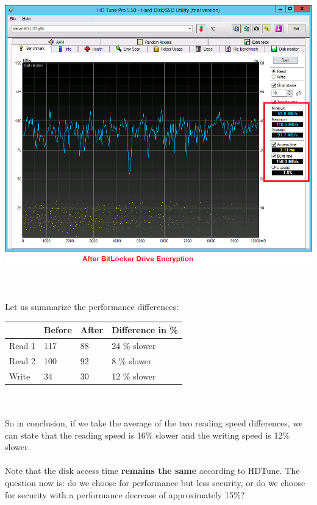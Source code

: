 \documentclass[11pt, a4paper]{article}
\begin{document}
$\;$ \\ \\
\noindent\begin{minipage}{\textwidth}
    \centering
    \includegraphics[width=\textwidth]{Post_BitLocker_2.png}
\end{minipage}
$\;$ \\ \\
Let us summarize the performance differences:
\begin{table}[h]
\begin{tabular}{|l|l|l|l|}
\hline
       & Before & After & Difference in \% \\ \hline
Read 1 & 117    & 88    & 24 \% slower     \\ \hline
Read 2 & 100    & 92    &   8 \% slower               \\ \hline
Write  & 34     & 30    &   12 \% slower               \\ \hline
\end{tabular}
\end{table}
$\;$ \\ \\
So in conclusion, if we take the average of the two reading speed differences, we can state that the reading speed is 16\% slower and the writing speed is 12\% slower. \\ \\
Note that the disk access time \textbf{remains the same} according to HDTune. The question now is: do we choose for performance but less security, or do we choose for security with a performance decrease of approximately 15\%?
\end{document}

